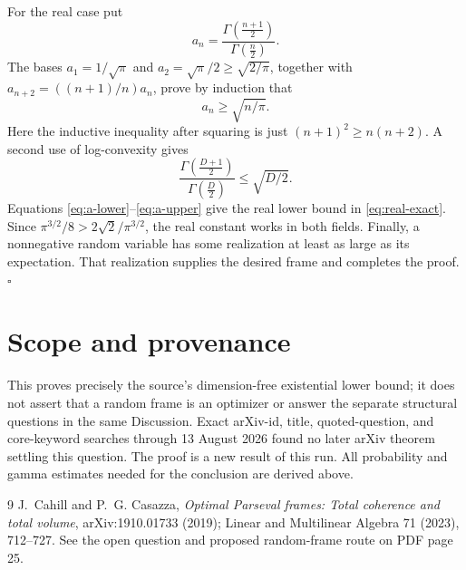 \documentclass[10pt]{article}
\begin{document}
For the real case put
\[
 a_n=\frac{\Gamma(\tfrac{n+1}{2})}{\Gamma(\tfrac n2)}.
\]
The bases \(a_1=1/\sqrt\pi\) and
\(a_2=\sqrt\pi/2\ge\sqrt{2/\pi}\), together with
\(a_{n+2}=((n+1)/n)a_n\), prove by induction that
\begin{equation}\label{eq:a-lower}
                         a_n\ge\sqrt{n/\pi}.
\end{equation}
Here the inductive inequality after squaring is just
\((n+1)^2\ge n(n+2)\).  A second use of log-convexity gives
\begin{equation}\label{eq:a-upper}
 \frac{\Gamma(\tfrac{D+1}{2})}{\Gamma(\tfrac D2)}
 \le\sqrt{D/2}.
\end{equation}
Equations \eqref{eq:a-lower}--\eqref{eq:a-upper} give the real lower bound in
\eqref{eq:real-exact}.  Since
\(\pi^{3/2}/8>2\sqrt2/\pi^{3/2}\), the real constant works in both fields.
Finally, a nonnegative random variable has some realization at least as large
as its expectation.  That realization supplies the desired frame and
completes the proof. \(\square\)

\section*{Scope and provenance}

This proves precisely the source's dimension-free existential lower bound; it
does not assert that a random frame is an optimizer or answer the separate
structural questions in the same Discussion.  Exact arXiv-id, title,
quoted-question, and core-keyword searches through 13 August 2026 found no
later arXiv theorem settling this question.  The proof is a new result of this
run.  All probability and gamma estimates needed for the conclusion are
derived above.

\begin{thebibliography}{9}
J.~Cahill and P.~G. Casazza,
\emph{Optimal Parseval frames: Total coherence and total volume},
arXiv:1910.01733 (2019); Linear and Multilinear Algebra 71 (2023), 712--727.
See the open question and proposed random-frame route on PDF page 25.
\end{thebibliography}
\end{document}
